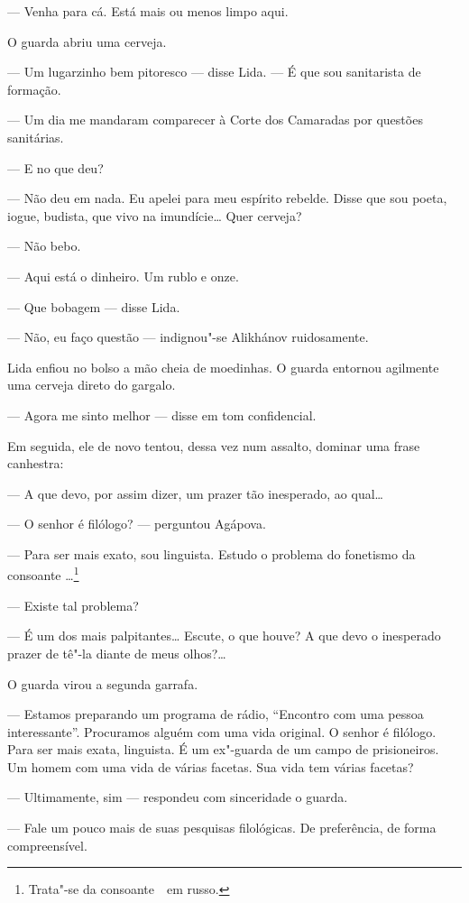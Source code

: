 --- Venha para cá. Está mais ou menos limpo aqui.

O guarda abriu uma cerveja.

--- Um lugarzinho bem pitoresco --- disse Lida. --- É que sou sanitarista
de formação.

--- Um dia me mandaram comparecer à Corte dos Camaradas por questões
sanitárias.

--- E no que deu?

--- Não deu em nada. Eu apelei para meu espírito rebelde. Disse que sou
poeta, iogue, budista, que vivo na imundície\ldots{} Quer cerveja?

--- Não bebo.

--- Aqui está o dinheiro. Um rublo e onze.

--- Que bobagem --- disse Lida.

--- Não, eu faço questão --- indignou"-se Alikhánov ruidosamente.

Lida enfiou no bolso a mão cheia de moedinhas. O guarda entornou
agilmente uma cerveja direto do gargalo.

--- Agora me sinto melhor --- disse em tom confidencial.

Em seguida, ele de novo tentou, dessa vez num assalto, dominar uma frase
canhestra:

--- A que devo, por assim dizer, um prazer tão inesperado, ao qual\ldots{}

--- O senhor é filólogo? --- perguntou Agápova.

--- Para ser mais exato, sou linguista. Estudo o problema do fonetismo
da consoante \ldots{}\footnote{Trata"-se da consoante {} em russo.}

--- Existe tal problema?

--- É um dos mais palpitantes\ldots{} Escute, o que houve? A que devo o
inesperado prazer de tê"-la diante de meus olhos?\ldots{}

O guarda virou a segunda garrafa.

--- Estamos preparando um programa de rádio, ``Encontro com uma pessoa
interessante''. Procuramos alguém com uma vida original. O senhor é
filólogo. Para ser mais exata, linguista. É um ex"-guarda de um campo de
prisioneiros. Um homem com uma vida de várias facetas. Sua vida tem
várias facetas?

--- Ultimamente, sim --- respondeu com sinceridade o guarda.

--- Fale um pouco mais de suas pesquisas filológicas. De preferência, de
forma compreensível.

